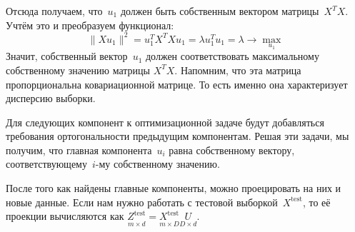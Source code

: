 \documentclass[12pt,fleqn]{article}
\begin{document}
Отсюда получаем, что~$u_1$ должен быть собственным вектором матрицы~$X^T X$.
Учтём это и преобразуем функционал:
\[
    \| X u_1 \|^2
    =
    u_1^T X^T X u_1
    =
    \lambda u_1^T u_1
    =
    \lambda
    \to
    \max_{u_1}
\]
Значит, собственный вектор~$u_1$ должен соответствовать максимальному
собственному значению матрицы $X^TX.$ Напомним, что эта матрица пропорциональна ковариационной матрице. То есть именно она характеризует дисперсию выборки. 

Для следующих компонент к оптимизационной задаче будут добавляться требования
ортогональности предыдущим компонентам.
Решая эти задачи, мы получим, что главная компонента~$u_i$
равна собственному вектору, соответствующему~$i$-му собственному значению.

После того как найдены главные компоненты, можно проецировать на них и новые данные.
Если нам нужно работать с тестовой выборкой~$X^{\text{test}}$, то её проекции вычисляются как $\underset{m \times d}{Z^{\text{test}}} = \underset{m \times D}{X^{\text{test}}} \underset{D \times d}{U}$.
\end{document}
